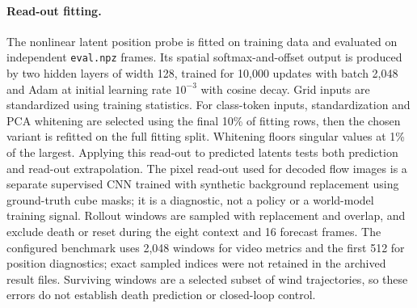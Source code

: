 \paragraph{Read-out fitting.}
The nonlinear latent position probe is fitted on training data and evaluated on independent
\texttt{eval.npz} frames. Its spatial softmax-and-offset output is produced by two hidden layers of width 128, trained for
10,000 updates with batch 2,048 and Adam at initial learning rate $10^{-3}$ with cosine decay.
Grid inputs are standardized using training statistics. For class-token inputs, standardization and
PCA whitening are selected using the final 10\% of fitting rows, then the chosen variant is refitted
on the full fitting split. Whitening floors singular values at 1\% of the largest.
Applying this read-out
to predicted latents tests both prediction and read-out extrapolation. The pixel read-out used for
decoded flow images is a separate supervised CNN trained with synthetic background replacement
using ground-truth cube masks; it is a diagnostic, not a policy or a world-model training signal.
Rollout windows are sampled with replacement and overlap, and exclude death or reset during the
eight context and 16 forecast frames. The configured benchmark uses 2,048 windows for video metrics
and the first 512 for position diagnostics; exact sampled indices were not retained in the archived
result files. Surviving windows are a selected subset of wind trajectories, so these errors do not
establish death prediction or closed-loop control.



\begin{table}[t]
\centering
\caption{Seed-0 cube position L1 error (pixels) for the grid and class-token JEPAs. ``Real'' evaluates
held-out encoded frames; ``Pred. 8'' evaluates the same read-out on eight-step predicted latents.
Gray conditions use more training transitions than black and color conditions.}
\label{tab:cube-readouts}
\end{table}

\begin{table}[t]
\centering
\caption{Seed-0 flow cube position L1 error (pixels). Latent and pixel columns use different
supervised read-outs. The persistent-color failure is visible before dynamics: real encoded position
has large error. These are model-recipe references rather than objective-only comparisons.}
\label{tab:cube-flow}
\end{table}

